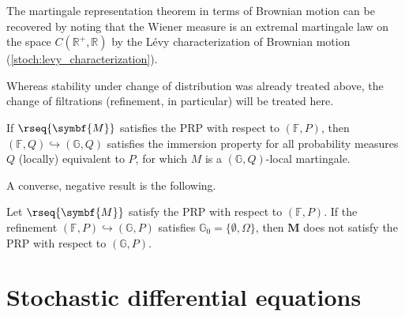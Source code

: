     \begin{remark}
        The martingale representation theorem in terms of Brownian motion can be recovered by noting that the Wiener measure is an extremal martingale law on the space $C(\mathbb{R}^+,\mathbb{R})$ by the L\'evy characterization of Brownian motion (\cref{stoch:levy_characterization}).
    \end{remark}

    Whereas stability under change of distribution was already treated above, the change of filtrations (refinement, in particular) will be treated here.

    \begin{property}\label{stoch:prp_refinement}
        If $\rseq{\symbf{M}}$ satisfies the PRP with respect to $(\mathbb{F},P)$, then $(\mathbb{F},Q)\hookrightarrow(\mathbb{G},Q)$ satisfies the immersion property for all probability measures $Q$ (locally) equivalent to $P$, for which $M$ is a $(\mathbb{G},Q)$-local martingale.
    \end{property}

    A converse, negative result is the following.
    \begin{property}
        Let $\rseq{\symbf{M}}$ satisfy the PRP with respect to $(\mathbb{F},P)$. If the refinement $(\mathbb{F},P)\hookrightarrow(\mathbb{G},P)$ satisfies $\mathbb{G}_0=\{\emptyset,\Omega\}$, then $\symbf{M}$ does not satisfy the PRP with respect to $(\mathbb{G},P)$.
    \end{property}

\section{Stochastic differential equations}

